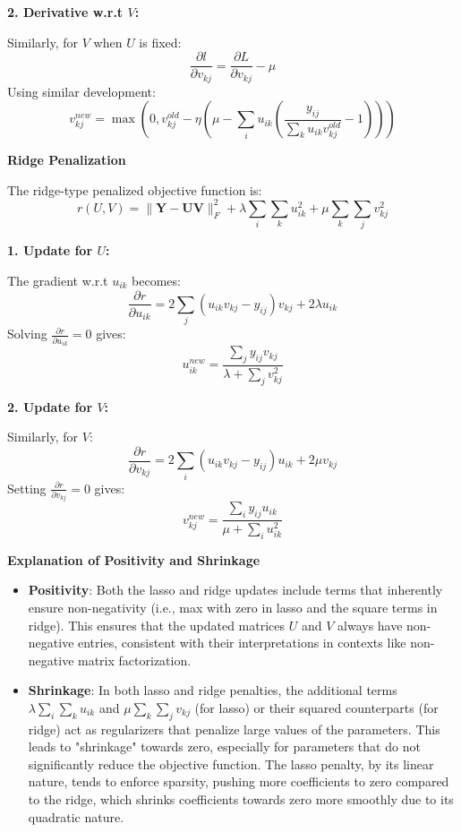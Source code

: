 \documentclass[8pt]{article}
\begin{document}
{\textbf{2. Derivative w.r.t \(V\):}
   
   Similarly, for \(V\) when \(U\) is fixed:
   \[
   \frac{\partial l}{\partial v_{kj}} = \frac{\partial L}{\partial v_{kj}} - \mu
   \]
   Using similar development:
   \[
   v_{kj}^{new} = \max\left(0, v_{kj}^{old} - \eta \left(\mu - \sum_i u_{ik} \left( \frac{y_{ij}}{\sum_k u_{ik} v_{kj}^{old}} - 1 \right)\right)\right)
   \]

\textbf{Ridge Penalization}

The ridge-type penalized objective function is:
\[
r(U, V) = \|\mathbf{Y} - \mathbf{UV}\|_F^2 + \lambda \sum_i \sum_k u_{ik}^2 + \mu \sum_k \sum_j v_{kj}^2
\]

\textbf{1. Update for \(U\):}
   
   The gradient w.r.t \(u_{ik}\) becomes:
   \[
   \frac{\partial r}{\partial u_{ik}} = 2 \sum_j (u_{ik}v_{kj} - y_{ij}) v_{kj} + 2\lambda u_{ik}
   \]
   Solving \( \frac{\partial r}{\partial u_{ik}} = 0 \) gives:
   \[
   u_{ik}^{new} = \frac{\sum_j y_{ij} v_{kj}}{\lambda + \sum_j v_{kj}^2}
   \]

\textbf{2. Update for \(V\):}
   
   Similarly, for \(V\):
   \[
   \frac{\partial r}{\partial v_{kj}} = 2 \sum_i (u_{ik}v_{kj} - y_{ij}) u_{ik} + 2\mu v_{kj}
   \]
   Setting \( \frac{\partial r}{\partial v_{kj}} = 0 \) gives:
   \[
   v_{kj}^{new} = \frac{\sum_i y_{ij} u_{ik}}{\mu + \sum_i u_{ik}^2}
   \]

\textbf{Explanation of Positivity and Shrinkage}

\begin{itemize}
    \item \textbf{Positivity}: Both the lasso and ridge updates include terms that inherently ensure non-negativity (i.e., max with zero in lasso and the square terms in ridge). This ensures that the updated matrices \(U\) and \(V\) always have non-negative entries, consistent with their interpretations in contexts like non-negative matrix factorization.
    \item \textbf{Shrinkage}: In both lasso and ridge penalties, the additional terms \( \lambda \sum_i \sum_k u_{ik} \) and \( \mu \sum_k \sum_j v_{kj} \) (for lasso) or their squared counterparts (for ridge) act as regularizers that penalize large values of the parameters. This leads to "shrinkage" towards zero, especially for parameters that do not significantly reduce the objective function. The lasso penalty, by its linear nature, tends to enforce sparsity, pushing more coefficients to zero compared to the ridge, which shrinks coefficients towards zero more smoothly due to its quadratic nature.
\end{itemize}

}
\end{document}
